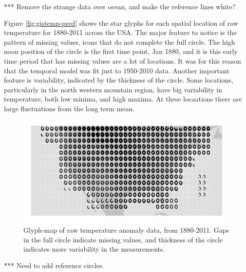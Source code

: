 \documentclass[oneside]{article}
\begin{document}
*** Remove the strange data over ocean, and make the reference lines white?


Figure \ref{fig:gistemp-pred} shows the star glyphs for each spatial location of raw temperature for 1880-2011 across the USA. The major feature to notice is the pattern of missing values, icons that do not complete the full circle. The high noon position of the circle is the first time point, Jan 1880, and it is this early time period that has missing values are a lot of locations. It was for this reason that the temporal model was fit just to 1950-2010 data. Another important feature is variability, indicated by the thickness of the circle. Some locations, particularly in the north western mountain region, have big variability in temperature, both low minima, and high maxima. At these locaations there are large fluctuations from the long term mean.

\begin{figure}[htbp]
  \centering

  \includegraphics[width=1\linewidth]{gistemp-polar-raw}

  \caption{Glyph-map of raw temperature anomaly data, from 1880-2011. Gaps in the full circle indicate missing values, and thickness of the circle indicates more variability in the measurements.}
  \label{fig:gistemp-raw}
\end{figure}

*** Need to add reference circles.
 
\end{document}
